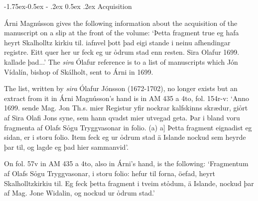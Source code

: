 \documentclass[11pt,twoside]{article}\makeatletter
\makeatletter
\def\ref{}
\renewcommand\subsection{\@startsection{subsection}{2}{\z@}%
     {-1.75ex\@plus -0.5ex \@minus- .2ex}%
     {0.5ex \@plus .2ex}%
     {\reset@font\Large\sffamily}}
\makeatother
\begin{document}
\subsection{Acquisition}
\par
{\name Árni Magnússon} gives the following information about the acquisition of the manuscript on a slip at the front of the volume: ‘Þetta fragment true eg hafa {\hskip1pt}\newline  heyrt Skalholltz kirkiu til. {\hskip1pt}\newline  iafnvel þott þad eigi stande {\hskip1pt}\newline  i neinu afhendingar registre. {\hskip1pt}\newline  Eitt quer her ur feck eg ur ỏd{\hskip1pt}\newline rum stad enn resten. {\hskip1pt}\newline  Sira Olafur 1699. kallade þad...’ The \textit{sira} Ólafur reference is to a list of manuscripts which {\name Jón Vídalín}, bishop of {\name Skálholt}, sent to Árni in 1699. \par
The list, written by \textit{sira} {\name Ólafur Jónsson} (1672-1702), no longer exists but an extract from it in Árni Magnússon's hand is in {\ref AM 435 a 4to}, fol. 154r-v: ‘Anno 1699. sende Mag. Jon Th.s. {\hskip1pt}\newline  mier Registur yfir nockrar kalf{\hskip1pt}\newline skinns skrædur, giỏrt af Sira Olafi Jons {\hskip1pt}\newline  syne, sem hann qvadst mier ut{\hskip1pt}\newline vegad geta. Þar i bland voru {\hskip1pt}\newline  fragmenta af Olafs Sỏgu Tryggva{\hskip1pt}\newline sonar in folio. (a)  a] Þetta fragment eignadist eg sidan, er i {\hskip1pt}\newline  storu folio. Item feck eg ur ỏdrum {\hskip1pt}\newline  stad ä Islande nockud sem heyrde þar {\hskip1pt}\newline  til, og lagde eg þad hier sammanvid’. \par
On fol. 57v in AM 435 a 4to, also in Árni's hand, is the following: ‘Fragmentum af Olafs Sỏgu Tryggvasonar, i storu folio: hefur til forna, öefad, heyrt Skalholltzkirkiu til. Eg feck þetta fragment i tveim stỏdum, ä Islande, nockud þar af Mag. Jone Widalin, og nockud ur ỏdrum stad.’ \par
\end{document}
